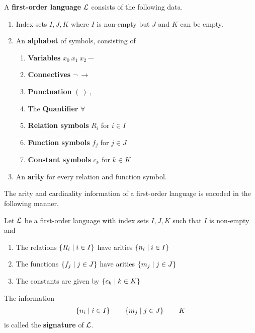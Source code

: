 \begin{boxdefinition}\label{Ch2:Def:First-Order_Language}
    A \textbf{first-order language} $\mathcal{L}$ consists of the following data.
    \begin{enumerate}
        \item Index sets $I, J, K$ where $I$ is non-empty but $J$ and $K$ can be empty.
        \item An \textbf{alphabet} of symbols, consisting of
        \begin{enumerate}[noitemsep]
            \item \textbf{Variables} $x_0 \ x_1 \ x_2 \ \cdots$
            \item \textbf{Connectives} $\neg \ \to$
            \item \textbf{Punctuation} $( \ ) \ ,$
            \item The \textbf{Quantifier} $\forall$
            \item \textbf{Relation symbols} $R_i$ for $i \in I$
            \item \textbf{Function symbols} $f_j$ for $j \in J$
            \item \textbf{Constant symbols} $c_k$ for $k \in K$
        \end{enumerate}
        \item An \textbf{arity} for every relation and function symbol.
    \end{enumerate}
\end{boxdefinition}

The arity and cardinality information of a first-order language is encoded in the following manner.

\begin{boxdefinition}[Signature]
    Let $\mathcal{L}$ be a first-order language with index sets $I, J, K$ such that $I$ is non-empty and
    \begin{enumerate}
        \item The relations $\left\{ R_i \; \middle\vert \; i \in I \right\}$ have arities $\left\{ n_i \; \middle\vert \; i \in I \right\}$
        \item The functions $\left\{ f_j \; \middle\vert \; j \in J \right\}$ have arities $\left\{ m_j \; \middle\vert \; j \in J \right\}$
        \item The constants are given by $\left\{ c_k \; \middle\vert \; k \in K \right\}$
    \end{enumerate}
    The information
    \begin{align*}
        \left\{ n_i \; \middle\vert \; i \in I \right\}
        \qquad
        \left\{ m_j \; \middle\vert \; j \in J \right\}
        \qquad
        K
    \end{align*}
    is called the \textbf{signature} of $\mathcal{L}$.
\end{boxdefinition}

